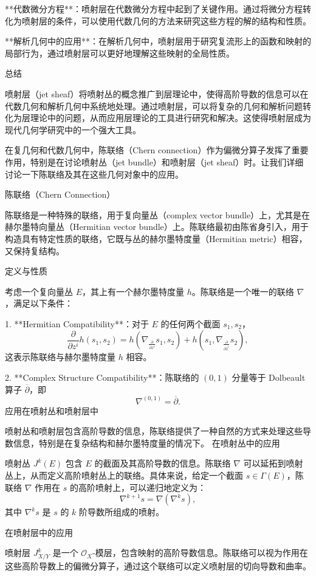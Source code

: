 \documentclass[lang=cn,12pt,a4paper,fontset=none]{beautybook}
\begin{document}
**代数微分方程**：喷射层在代数微分方程中起到了关键作用。通过将微分方程转化为喷射层的条件，可以使用代数几何的方法来研究这些方程的解的结构和性质。

**解析几何中的应用**：在解析几何中，喷射层用于研究复流形上的函数和映射的局部行为，通过喷射层可以更好地理解这些映射的全局性质。

总结

喷射层（jet sheaf）将喷射丛的概念推广到层理论中，使得高阶导数的信息可以在代数几何和解析几何中系统地处理。通过喷射层，可以将复杂的几何和解析问题转化为层理论中的问题，从而应用层理论的工具进行研究和解决。这使得喷射层成为现代几何学研究中的一个强大工具。

在复几何和代数几何中，陈联络（Chern connection）作为偏微分算子发挥了重要作用，特别是在讨论喷射丛（jet bundle）和喷射层（jet sheaf）时。让我们详细讨论一下陈联络及其在这些几何对象中的应用。

 陈联络（Chern Connection）

陈联络是一种特殊的联络，用于复向量丛（complex vector bundle）上，尤其是在赫尔墨特向量丛（Hermitian vector bundle）上。陈联络最初由陈省身引入，用于构造具有特定性质的联络，它既与丛的赫尔墨特度量（Hermitian metric）相容，又保持复结构。

定义与性质

考虑一个复向量丛 $E$，其上有一个赫尔墨特度量 $h$。陈联络是一个唯一的联络 $\nabla$，满足以下条件：

1. **Hermitian Compatibility**：对于 $E$ 的任何两个截面 $s_1, s_2$，
   $$
   \frac{\partial}{\partial z^i} h(s_1, s_2) = h(\nabla_{\frac{\partial}{\partial z^i}} s_1, s_2) + h(s_1, \nabla_{\frac{\partial}{\partial \overline{z}^i}} s_2),
   $$
   这表示陈联络与赫尔墨特度量 $h$ 相容。

2. **Complex Structure Compatibility**：陈联络的 $(0,1)$ 分量等于 Dolbeault 算子 $\overline{\partial}$，即
   $$
   \nabla^{(0,1)} = \overline{\partial}.
   $$
应用在喷射丛和喷射层中

喷射丛和喷射层包含高阶导数的信息，陈联络提供了一种自然的方式来处理这些导数信息，特别是在复杂结构和赫尔墨特度量的情况下。
在喷射丛中的应用

喷射丛 $J^k(E)$ 包含 $E$ 的截面及其高阶导数的信息。陈联络 $\nabla$ 可以延拓到喷射丛上，从而定义高阶喷射丛上的联络。具体来说，给定一个截面 $s \in \Gamma(E)$，陈联络 $\nabla$ 作用在 $s$ 的高阶喷射上，可以递归地定义为：
$$
\nabla^{k+1} s = \nabla (\nabla^k s),
$$
其中 $\nabla^k s$ 是 $s$ 的 $k$ 阶导数所组成的喷射。

在喷射层中的应用

喷射层 $J^k_{X/Y}$ 是一个 $\mathcal{O}_X$-模层，包含映射的高阶导数信息。陈联络可以视为作用在这些高阶导数上的偏微分算子，通过这个联络可以定义喷射层的切向导数和曲率。
\end{document}
